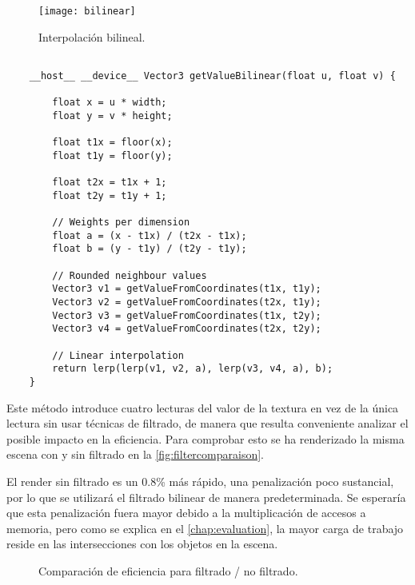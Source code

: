 \begin{figure}[H]
	\label{fig:bilinear}
	\centering
	\texttt{[image: bilinear]}
	\caption{Interpolación bilineal.}
\end{figure}
	
\begin{minipage}[c]{0.95\textwidth}
\begin{lstlisting}[label={cod:bilinear}, caption={Código interpolación bilineal.}]
	
	__host__ __device__ Vector3 getValueBilinear(float u, float v) {
        
        float x = u * width;
        float y = v * height;

        float t1x = floor(x);
        float t1y = floor(y);

        float t2x = t1x + 1;
        float t2y = t1y + 1;

		// Weights per dimension
        float a = (x - t1x) / (t2x - t1x);
        float b = (y - t1y) / (t2y - t1y);

		// Rounded neighbour values
        Vector3 v1 = getValueFromCoordinates(t1x, t1y);
        Vector3 v2 = getValueFromCoordinates(t2x, t1y);
        Vector3 v3 = getValueFromCoordinates(t1x, t2y);
        Vector3 v4 = getValueFromCoordinates(t2x, t2y);

		// Linear interpolation
        return lerp(lerp(v1, v2, a), lerp(v3, v4, a), b);
	}
\end{lstlisting}
\end{minipage}	

Este método introduce cuatro lecturas del valor de la textura en vez de la única lectura sin usar técnicas de filtrado, de manera que resulta conveniente analizar el posible impacto en la eficiencia. Para comprobar esto se ha renderizado la misma escena con y sin filtrado en la \autoref{fig:filtercomparaison}. 
	
El render sin filtrado es un 0.8\% más rápido, una penalización poco sustancial, por lo que se utilizará el filtrado bilinear de manera predeterminada. Se esperaría que esta penalización fuera mayor debido a la multiplicación de accesos a memoria, pero como se explica en el \autoref{chap:evaluation}, la mayor carga de trabajo reside en las intersecciones con los objetos en la escena.

\begin{figure}[H]
\centering
{}
\caption{Comparación de eficiencia para filtrado / no filtrado.}
\label{fig:filtercomparaison}
\end{figure}
	
